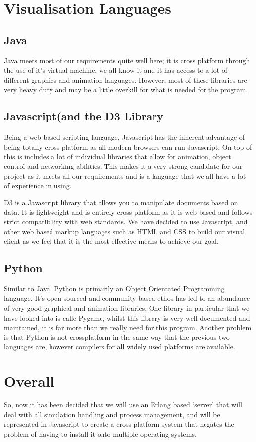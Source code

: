 \documentclass[a4paper,12pt]{article}
\begin{document}
\section{Visualisation Languages}
\subsection{Java}
Java meets most of our requirements quite well here; it is cross platform through the use of it’s virtual machine, we all know it and it has access to a lot of different graphics and animation languages. However, most of these libraries are very heavy duty and may be a little overkill for what is needed for the program.
\subsection{Javascript(and the D3 Library}
Being a web-based scripting language, Javascript has the inherent advantage of being totally cross platform as all modern browsers can run Javascript. On top of this is includes a lot of individual libraries that allow for animation, object control and networking abilities. This makes it a very strong candidate for our project as it meets all our requirements and is a language that we all have a lot of experience in using.

D3 is a Javascript library that allows you to manipulate documents based on data. It is lightweight and is entirely cross platform as it is web-based and follows strict compatibility with web standards. We have decided to use Javascript, and other web based markup languages such as HTML and CSS to build our visual client as we feel that it is the most effective means to achieve our goal.
\subsection{Python}
Similar to Java, Python is primarily an Object Orientated Programming language. It’s open sourced and community based ethos has led to an abundance of very good graphical and animation libraries. One library in particular that we have looked into is calle Pygame, whilst this library is very well documented and maintained, it is far more than we really need for this program. Another problem is that Python is not crossplatform in the same way that the previous two languages are, however compilers for all widely used platforms are available.
\section{Overall}
So, now it has been decided that we will use an Erlang based ‘server’ that will deal with all simulation handling and process management, and will be represented in Javascript to create a cross platform system that negates the problem of having to install it onto multiple operating systems.
\end{document}
